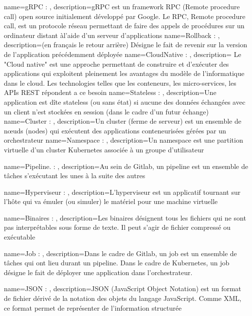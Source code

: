 {
    name=gRPC : ,
    description={gRPC est un framework RPC (Remote procedure call) open source initialement développé par Google. Le RPC, Remote procedure call, est un protocole réseau permettant de faire des appels de procédures sur un ordinateur distant àl’aide d’un serveur d’applications}
}
{
    name=Rollback : ,
    description={(en français le retour arrière) Désigne le fait de revenir sur la version de l'application précédemment déployée}
}
{
    name=CloudNative : ,
    description={ Le "Cloud native" est une approche permettant de construire et d'exécuter des applications qui exploitent pleinement les avantages du modèle de l'informatique dans le cloud. Les technologies telles que les conteneurs, les micro-services, les APIs REST répondent a ce besoin}
}
{
    name=Stateless : ,
    description={Une application est dîte stateless (ou sans état) si aucune des données échangées avec un client n'est stockées en session (dans le cadre d'un futur échange)}
}
{
    name=Cluster : ,
    description={Un cluster  (ferme de serveur) est un ensemble de nœuds (nodes) qui exécutent des applications conteneurisées gérées par un orchestrateur}
}
{
    name=Namespace : ,
    description={Un namespace est une partition virtuelle d'un cluster Kubernetes associée à un groupe d'utilisateur}
}

{
    name=Pipeline. : ,
    description={Au sein de Gitlab, un pipeline est un ensemble de tâches s'exécutant les unes à la suite des autres}
}


{
    name=Hyperviseur : ,
    description={L’hyperviseur est un applicatif tournant sur l’hôte qui va émuler (ou simuler) le matériel pour une machine virtuelle}
}

{
    name=Binaires : ,
    description={Les binaires désignent tous les fichiers qui ne sont pas interprétables sous forme de texte. Il peut s'agir de fichier compressé ou exécutable}
}

{
    name=Job : ,
    description={Dans le cadre de Gitlab, un job est un ensemble de tâches qui ont lieu durant un pipeline. Dans le cadre de Kubernetes, un job désigne le fait de déployer une application dans l'orchestrateur.}
}

{
    name=JSON : ,
    description={JSON (JavaScript Object Notation) est un format de fichier dérivé de la notation des objets du langage JavaScript. Comme XML, ce format permet de représenter de l’information structurée}
}

